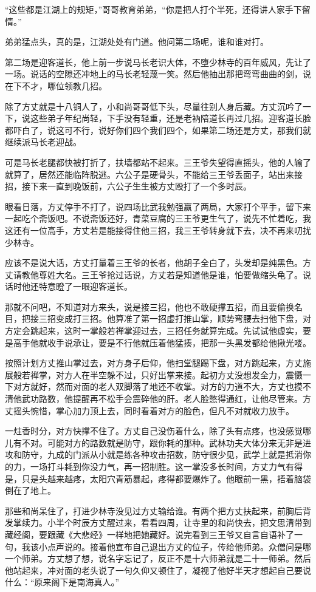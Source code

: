 “这些都是江湖上的规矩，”哥哥教育弟弟，“你是把人打个半死，还得讲人家手下留情。”

弟弟猛点头，真的是，江湖处处有门道。他问第二场呢，谁和谁对打。

第二场是迎客道长，他上前一步说马长老识大体，不堕少林寺的百年威风，先让了一场。说话的空隙还冲地上的马长老轻蔑一笑。然后他抽出那把弯弯曲曲的剑，说在下不才，哪位领教几招。

除了方丈就是十八铜人了，小和尚哥哥低下头，尽量往别人身后藏。方丈沉吟了一下，说这些弟子年纪尚轻，下手没有轻重，还是老衲陪道长再过几招。迎客道长脸都吓白了，说这可不行，说好你们四个我们四个，如果第二场还是方丈，那我们就继续派马长老迎战。

可是马长老腿都快被打折了，扶墙都站不起来。三王爷失望得直摇头，他的人输了就算了，居然还能临阵脱逃。六公子是硬骨头，不能给三王爷丢面子，站出来接招，接下来一直到晚饭前，六公子生生被方丈殴打了一个多时辰。

眼看日落，方丈停手不打了，说四场比武我勉强赢了两局，大家打个平手，留下来一起吃个斋饭吧。不说斋饭还好，青菜豆腐的三王爷更生气了，说先不忙着吃，我这还有一位高手，方丈若是能接得住他三招，我三王爷转身就下去，决不再来叨扰少林寺。

应该不是说大话，方丈打量着三王爷的长者，他胡子全白了，头发却是纯黑色。方丈请教他尊姓大名。三王爷抢过话说，方丈若是知道他是谁，怕要做缩头龟了。说话时他还特意瞪了一眼迎客道长。

那就不问吧，不知道对方来头，说是接三招，他也不敢硬撑五招，而且要偷换名目，把接三招变成打三招。他算准了第一招虚打推山掌，顺势弯腰去扫他下盘，对方定会跳起来，这时一掌般若禅掌迎过去，三招任务就算完成。先试试他虚实，要是高手他就收手说承让，要是不行他就压着他猛揍，把那一头黑发都给他揪光喽。

按照计划方丈推山掌过去，对方身子后仰，他扫堂腿踢下盘，对方跳起来，方丈施展般若禅掌，对方人在半空躲不过，只好出掌来接。起初方丈没想发全力，震慑一下对方就好，然而对面的老人双脚落了地还不收掌。对方的力道不大，方丈也摸不清他武功路数，他提醒再不松手会震碎他的肝。老人脸憋得通红，让他尽管来。方丈摇头惋惜，掌心加力顶上去，同时看着对方的脸色，但凡不对就收力放手。

一炷香时分，对方快撑不住了。方丈自己没伤着什么，除了头有点疼，也没感觉哪儿有不对。可能对方的路数就是防守，跟你耗的那种。武林功夫大体分来无非是进攻和防守，九成的门派从小就是练各种攻击招数，防守很少见，武学上就是抵消你的力，一场打斗耗到你没力气，再一招制胜。这一掌没多长时间，方丈力气有得是，只是头越来越疼，太阳穴青筋暴起，疼得都要爆炸了。他眼前一黑，捂着脑袋倒在了地上。

那些和尚呆住了，打进少林寺没见过方丈输给谁。有两个把方丈扶起来，前胸后背发掌续力。小半个时辰方丈醒过来，看看四周，让寺里的和尚快去，把文思清带到藏经阁，要跟藏《大悲经》一样地把她藏好。说完看到三王爷又自言自语补了一句，我该小点声说的。接着他宣布自己退出方丈的位子，传给他师弟。众僧问是哪一个师弟。方丈想了想，说名字忘记了，反正不是十六师弟就是二十一师弟。然后他站起来，冲对面的老头说了一句久仰又顿住了，凝视了他好半天才想起自己要说什么：“原来阁下是南海真人。”
\newline

